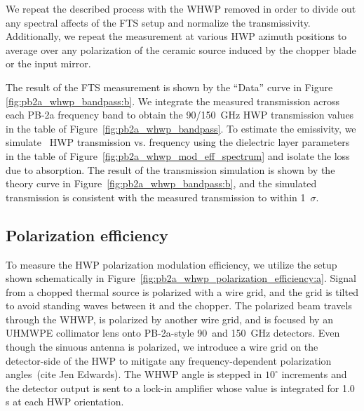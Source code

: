 We repeat the described process with the WHWP removed in order to divide out any spectral affects of the FTS setup and normalize the transmissivity. Additionally, we repeat the measurement at various HWP azimuth positions to average over any polarization of the ceramic source induced by the chopper blade or the input mirror.

The result of the FTS measurement is shown by the ``Data'' curve in Figure \ref{fig:pb2a_whwp_bandpass:b}. We integrate the measured transmission across each PB-2a frequency band to obtain the 90/150~GHz HWP transmission values in the table of Figure~\ref{fig:pb2a_whwp_bandpass}. To estimate the emissivity, we simulate~\cite{essinger-hileman_transfer_2013} HWP transmission vs. frequency using the dielectric layer parameters in the table of Figure~\ref{fig:pb2a_whwp_mod_eff_spectrum} and isolate the loss due to absorption. The result of the transmission simulation is shown by the theory curve in Figure~\ref{fig:pb2a_whwp_bandpass:b}, and the simulated transmission is consistent with the measured transmission to within 1~$\sigma$.


\subsection{Polarization efficiency}
\label{sec:pb2a_whwp_polarization_efficiency}

To measure the HWP polarization modulation efficiency, we utilize the setup shown schematically in Figure~\ref{fig:pb2a_whwp_polarization_efficiency:a}. Signal from a chopped thermal source is polarized with a wire grid, and the grid is tilted to avoid standing waves between it and the chopper. The polarized beam travels through the WHWP, is polarized by another wire grid, and is focused by an UHMWPE collimator lens onto PB-2a-style 90~and 150~GHz detectors. Even though the sinuous antenna is polarized, we introduce a wire grid on the detector-side of the HWP to mitigate any frequency-dependent polarization angles~(cite Jen Edwards). The WHWP angle is stepped in $10^{\circ}$ increments and the detector output is sent to a lock-in amplifier whose value is integrated for 1.0 s at each HWP orientation.

